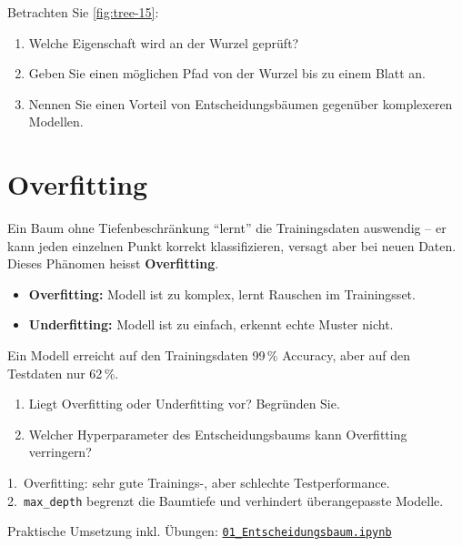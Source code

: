 \begin{myexercise}
Betrachten Sie \cref{fig:tree-15}:
\begin{enumerate}
    \item Welche Eigenschaft wird an der Wurzel geprüft?
    \item Geben Sie einen möglichen Pfad von der Wurzel bis zu einem Blatt an.
    \item Nennen Sie einen Vorteil von Entscheidungsbäumen gegenüber komplexeren Modellen.
\end{enumerate}
\end{myexercise}

\section{Overfitting}

\begin{myattention}
Ein Baum ohne Tiefenbeschränkung \enquote{lernt} die Trainingsdaten auswendig --
er kann jeden einzelnen Punkt korrekt klassifizieren, versagt aber bei neuen Daten.
Dieses Phänomen heisst \textbf{Overfitting}.
\end{myattention}

\begin{mydefinition}
\begin{itemize}
    \item \textbf{Overfitting:} Modell ist zu komplex, lernt Rauschen im Trainingsset.
    \item \textbf{Underfitting:} Modell ist zu einfach, erkennt echte Muster nicht.
\end{itemize}
\end{mydefinition}

\begin{myexercise}
Ein Modell erreicht auf den Trainingsdaten 99\,\% Accuracy,
aber auf den Testdaten nur 62\,\%.
\begin{enumerate}
    \item Liegt Overfitting oder Underfitting vor? Begründen Sie.
    \item Welcher Hyperparameter des Entscheidungsbaums kann Overfitting verringern?
\end{enumerate}
\begin{myanswer}
1.\ Overfitting: sehr gute Trainings-, aber schlechte Testperformance. \\
2.\ \texttt{max\_depth} begrenzt die Baumtiefe und verhindert überangepasste Modelle.
\end{myanswer}
\end{myexercise}

\begin{myremark}[Notebook]
Praktische Umsetzung inkl. Übungen:
\href{\notebookbaseurl01_Entscheidungsbaum_Classification.ipynb}{\texttt{01\_Entscheidungsbaum.ipynb}}
\end{myremark}
